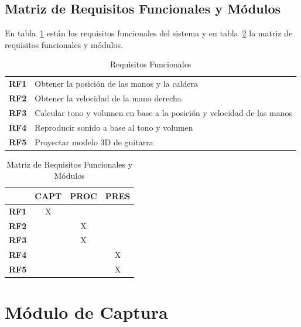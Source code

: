 \documentclass[a4paper,10pt]{article}
\begin{document}
\subsection{Matriz de Requisitos Funcionales y Módulos}
En tabla~\ref{tab:req_func} están los requisitos funcionales del sistema y en
tabla~\ref{tab:matriz} la matriz de requisitos funcionales y módulos.
\begin{table}[hpb]
        \centering
        \begin{tabularx}{0.8\textwidth}{p{8mm} X}
                \textbf{RF1} & Obtener la posición de las manos y la caldera \\
                \textbf{RF2} & Obtener la velocidad de la mano derecha \\
                \textbf{RF3} & Calcular tono y volumen en base a la posición y velocidad de las manos \\
                \textbf{RF4} & Reproducir sonido a base al tono y volumen \\
                \textbf{RF5} & Proyectar modelo 3D de guitarra \\
        \end{tabularx}
        \caption{Requisitos Funcionales}
        \label{tab:req_func}
\end{table}
\begin{table}[hpb]
        \centering
        \begin{tabular}{|p{8mm}|c|c|c|}
                \hline
                & \textbf{CAPT} & \textbf{PROC} & \textbf{PRES} \\
                \hline
                \textbf{RF1} & X & & \\
                \hline
                \textbf{RF2} & & X & \\
                \hline
                \textbf{RF3} & & X & \\
                \hline
                \textbf{RF4} & & & X \\
                \hline
                \textbf{RF5} & & & X \\
                \hline
        \end{tabular}
        \caption{Matriz de Requisitos Funcionales y Módulos}
        \label{tab:matriz}
\end{table}
\section{Módulo de Captura}
\label{sec:captura}
\end{document}
